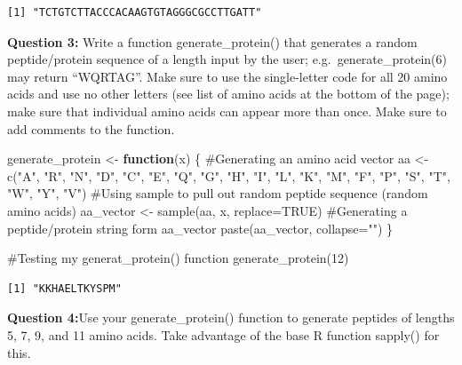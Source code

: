 \documentclass[
  letterpaper,
  DIV=11,
  numbers=noendperiod]{scrartcl}
\newenvironment{Shaded}{\begin{snugshade}}{\end{snugshade}}
\newcommand{\AttributeTok}[1]{\textcolor[rgb]{0.40,0.45,0.13}{#1}}
\newcommand{\CommentTok}[1]{\textcolor[rgb]{0.37,0.37,0.37}{#1}}
\newcommand{\ConstantTok}[1]{\textcolor[rgb]{0.56,0.35,0.01}{#1}}
\newcommand{\ControlFlowTok}[1]{\textcolor[rgb]{0.00,0.23,0.31}{\textbf{#1}}}
\newcommand{\DecValTok}[1]{\textcolor[rgb]{0.68,0.00,0.00}{#1}}
\newcommand{\FunctionTok}[1]{\textcolor[rgb]{0.28,0.35,0.67}{#1}}
\newcommand{\NormalTok}[1]{\textcolor[rgb]{0.00,0.23,0.31}{#1}}
\newcommand{\OtherTok}[1]{\textcolor[rgb]{0.00,0.23,0.31}{#1}}
\newcommand{\StringTok}[1]{\textcolor[rgb]{0.13,0.47,0.30}{#1}}
\begin{document}
\begin{verbatim}
[1] "TCTGTCTTACCCACAAGTGTAGGGCGCCTTGATT"
\end{verbatim}

\textbf{Question 3:} Write a function generate\_protein() that generates
a random peptide/protein sequence of a length input by the user;
e.g.~generate\_protein(6) may return ``WQRTAG''. Make sure to use the
single-letter code for all 20 amino acids and use no other letters (see
list of amino acids at the bottom of the page); make sure that
individual amino acids can appear more than once. Make sure to add
comments to the function.

\begin{Shaded}
\begin{Highlighting}[]
\NormalTok{  generate\_protein }\OtherTok{\textless{}{-}} \ControlFlowTok{function}\NormalTok{(x) \{}
    \CommentTok{\#Generating an amino acid vector}
\NormalTok{    aa }\OtherTok{\textless{}{-}} \FunctionTok{c}\NormalTok{(}\StringTok{"A"}\NormalTok{, }\StringTok{"R"}\NormalTok{, }\StringTok{"N"}\NormalTok{, }\StringTok{"D"}\NormalTok{, }\StringTok{"C"}\NormalTok{, }\StringTok{"E"}\NormalTok{, }\StringTok{"Q"}\NormalTok{, }\StringTok{"G"}\NormalTok{, }\StringTok{"H"}\NormalTok{, }\StringTok{"I"}\NormalTok{, }\StringTok{"L"}\NormalTok{, }\StringTok{"K"}\NormalTok{, }\StringTok{"M"}\NormalTok{, }\StringTok{"F"}\NormalTok{, }\StringTok{"P"}\NormalTok{, }\StringTok{"S"}\NormalTok{, }\StringTok{"T"}\NormalTok{, }\StringTok{"W"}\NormalTok{, }\StringTok{"Y"}\NormalTok{, }\StringTok{"V"}\NormalTok{)}
    \CommentTok{\#Using sample to pull out random peptide sequence (random amino acids)}
\NormalTok{   aa\_vector }\OtherTok{\textless{}{-}} \FunctionTok{sample}\NormalTok{(aa, x, }\AttributeTok{replace=}\ConstantTok{TRUE}\NormalTok{)}
   \CommentTok{\#Generating a peptide/protein string form aa\_vector}
   \FunctionTok{paste}\NormalTok{(aa\_vector, }\AttributeTok{collapse=}\StringTok{""}\NormalTok{)}
\NormalTok{  \}}

\CommentTok{\#Testing my generat\_protein() function}
\FunctionTok{generate\_protein}\NormalTok{(}\DecValTok{12}\NormalTok{)}
\end{Highlighting}
\end{Shaded}

\begin{verbatim}
[1] "KKHAELTKYSPM"
\end{verbatim}

\textbf{Question 4:}Use your generate\_protein() function to generate
peptides of lengths 5, 7, 9, and 11 amino acids. Take advantage of the
base R function sapply() for this.
\end{document}
